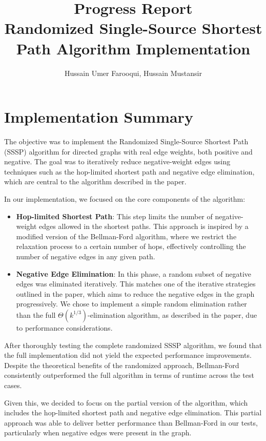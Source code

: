 \documentclass[12pt]{article}
\title{Progress Report \\
Randomized Single-Source Shortest Path Algorithm Implementation}
\author{Hussain Umer Farooqui, Hussain Mustansir}
\begin{document}
\maketitle

\section{Implementation Summary}

The objective was to implement the Randomized Single-Source Shortest Path (SSSP) algorithm for directed graphs with real edge weights, both positive and negative. The goal was to iteratively reduce negative-weight edges using techniques such as the hop-limited shortest path and negative edge elimination, which are central to the algorithm described in the paper.

In our implementation, we focused on the core components of the algorithm:

\begin{itemize}
    \item \textbf{Hop-limited Shortest Path}: This step limits the number of negative-weight edges allowed in the shortest paths. This approach is inspired by a modified version of the Bellman-Ford algorithm, where we restrict the relaxation process to a certain number of hops, effectively controlling the number of negative edges in any given path.
    \item \textbf{Negative Edge Elimination}: In this phase, a random subset of negative edges was eliminated iteratively. This matches one of the iterative strategies outlined in the paper, which aims to reduce the negative edges in the graph progressively. We chose to implement a simple random elimination rather than the full $\Theta(k^{1/3})$-elimination algorithm, as described in the paper, due to performance considerations.
\end{itemize}

After thoroughly testing the complete randomized SSSP algorithm, we found that the full implementation did not yield the expected performance improvements. Despite the theoretical benefits of the randomized approach, Bellman-Ford consistently outperformed the full algorithm in terms of runtime across the test cases. 

Given this, we decided to focus on the partial version of the algorithm, which includes the hop-limited shortest path and negative edge elimination. This partial approach was able to deliver better performance than Bellman-Ford in our tests, particularly when negative edges were present in the graph. 
\end{document}
